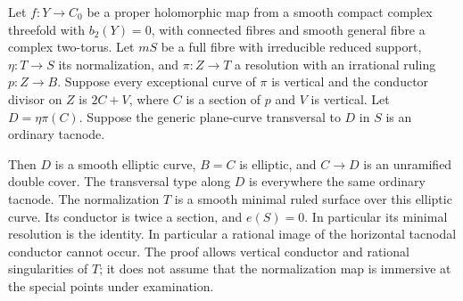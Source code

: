 
\begin{proposition}\label{cdp:st:A.5.18}
Let $f:Y\to C_0$ be a proper holomorphic map from a smooth
compact complex threefold with $b_2(Y)=0$, with connected
fibres and smooth general fibre a complex two-torus.
Let $mS$ be a full fibre with irreducible reduced support,
$\eta:T\to S$ its normalization, and $\pi:Z\to T$ a
resolution with an irrational ruling $p:Z\to B$.
Suppose every exceptional curve of $\pi$ is vertical and
the conductor divisor on $Z$ is $2C+V$, where $C$ is a
section of $p$ and $V$ is vertical. Let $D=\eta\pi(C)$.
Suppose the generic plane-curve transversal to $D$ in $S$ is an
ordinary tacnode.

Then $D$ is a smooth elliptic curve, $B=C$ is elliptic,
and $C\to D$ is an unramified double cover. The transversal
type along $D$ is everywhere the same ordinary tacnode.
The normalization $T$ is a smooth minimal ruled surface
over this elliptic curve. Its conductor is twice a
section, and $e(S)=0$. In particular its minimal
resolution is the identity.
In particular a rational image of
the horizontal tacnodal conductor cannot occur. The proof
allows vertical conductor and rational singularities of
$T$; it does not assume that the normalization map is
immersive at the special points under examination.
\end{proposition}
